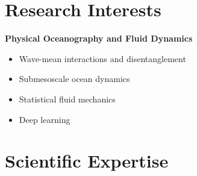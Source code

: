 \documentclass[a4paper,12pt]{article}
\begin{document}
\section{Research Interests}
\textbf{Physical Oceanography and Fluid Dynamics}
\begin{itemize}[leftmargin=*,noitemsep]
\item{Wave-mean interactions and disentanglement}
\item{Submesoscale ocean dynamics}
\item{Statistical fluid mechanics}
\item{Deep learning}
\end{itemize}

\section{Scientific Expertise}
\end{document}
